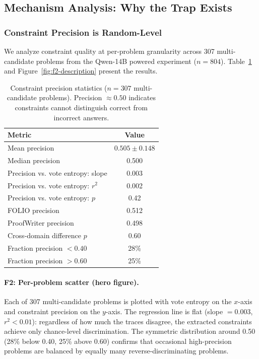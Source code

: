 \documentclass[11pt,a4paper]{article}
\begin{document}
\subsection{Mechanism Analysis: Why the Trap Exists}
\label{sec:mechanism}

\subsubsection{Constraint Precision is Random-Level}

We analyze constraint quality at per-problem granularity across 307 multi-candidate problems from the Qwen-14B powered experiment ($n{=}804$). Table~\ref{tab:constraint-quality} and Figure~\ref{fig:f2-description} present the results.

\begin{table}[t]
\centering
\small
\caption{Constraint precision statistics ($n{=}307$ multi-candidate problems). Precision $\approx 0.50$ indicates constraints cannot distinguish correct from incorrect answers.}
\label{tab:constraint-quality}
\begin{tabular}{lc}
\toprule
\textbf{Metric} & \textbf{Value} \\
\midrule
Mean precision & $0.505 \pm 0.148$ \\
Median precision & 0.500 \\
Precision vs. vote entropy: slope & 0.003 \\
Precision vs. vote entropy: $r^2$ & 0.002 \\
Precision vs. vote entropy: $p$ & 0.42 \\
\midrule
FOLIO precision & 0.512 \\
ProofWriter precision & 0.498 \\
Cross-domain difference $p$ & 0.60 \\
\midrule
Fraction precision $< 0.40$ & 28\% \\
Fraction precision $> 0.60$ & 25\% \\
\bottomrule
\end{tabular}
\end{table}

\paragraph{F2: Per-problem scatter (hero figure).} Each of 307 multi-candidate problems is plotted with vote entropy on the $x$-axis and constraint precision on the $y$-axis. The regression line is flat (slope $= 0.003$, $r^2 < 0.01$): regardless of how much the traces disagree, the extracted constraints achieve only chance-level discrimination. The symmetric distribution around 0.50 (28\% below 0.40, 25\% above 0.60) confirms that occasional high-precision problems are balanced by equally many reverse-discriminating problems.
\end{document}
